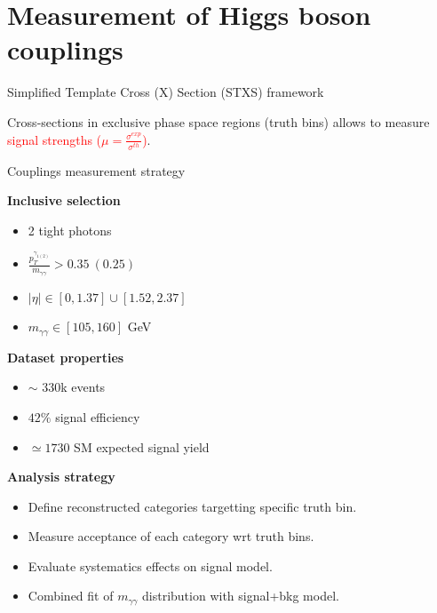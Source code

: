\section{Measurement of Higgs boson couplings}
\frame{\tableofcontents[currentsection]}

\begin{frame}{Simplified Template Cross (X) Section (STXS) framework}
  \centering
      
      Cross-sections in exclusive phase space regions (truth bins) allows to measure \textcolor{red}{signal strengths ($\mu=\frac{\sigma^{exp}}{\sigma^{th}}$)}.
  
\end{frame}
\begin{frame}{Couplings measurement strategy}

  \begin{minipage}{0.49\linewidth}
  {\bf Inclusive selection }
  \begin{itemize}
  \item 2 tight photons
  \item $\frac{p_T^{\gamma_{1(2)}}}{m_{\gamma\gamma}} > 0.35~ (0.25)$
  \item $|\eta|\in [0, 1.37]  \cup [1.52, 2.37]$
  \item $m_{\gamma\gamma} \in [105, 160]$ GeV
  \end{itemize}
  \end{minipage}
  \hfill
  \begin{minipage}{0.49\linewidth}
    {\bf Dataset properties}  

    \begin{itemize}
    \item $\sim$ 330k events
    \item $42\%$ signal efficiency
    \item $\simeq 1730$ SM expected signal yield
    \end{itemize}
  \end{minipage}
  \vfill
  {\bf Analysis strategy } 
  \begin{itemize}
  \item Define reconstructed categories targetting specific truth bin.
  \item Measure acceptance of each category wrt truth bins.
  \item Evaluate systematics effects on signal model.
  \item Combined fit of $m_{\gamma\gamma}$ distribution with signal+bkg model.
  \end{itemize}

\end{frame}

